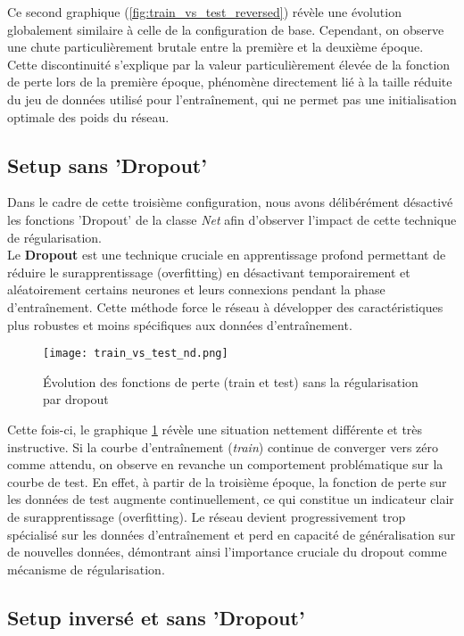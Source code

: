 Ce second graphique (\ref{fig:train_vs_test_reversed}) révèle une évolution globalement similaire à celle de la configuration de base. Cependant, on observe une chute particulièrement brutale entre la première et la deuxième époque. Cette discontinuité s'explique par la valeur particulièrement élevée de la fonction de perte lors de la première époque, phénomène directement lié à la taille réduite du jeu de données utilisé pour l'entraînement, qui ne permet pas une initialisation optimale des poids du réseau.

\newpage
\subsection{Setup sans 'Dropout'}
\label{Setup_nd}

Dans le cadre de cette troisième configuration, nous avons délibérément désactivé les fonctions 'Dropout' de la classe \textit{Net} afin d'observer l'impact de cette technique de régularisation.\\
Le \textbf{Dropout} est une technique cruciale en apprentissage profond permettant de réduire le surapprentissage (overfitting) en désactivant temporairement et aléatoirement certains neurones et leurs connexions pendant la phase d'entraînement. Cette méthode force le réseau à développer des caractéristiques plus robustes et moins spécifiques aux données d'entraînement.

\begin{figure}[H]
    \centering
    \texttt{[image: train\_vs\_test\_nd.png]}
    \caption{Évolution des fonctions de perte (train et test) sans la régularisation par dropout}
    \label{fig:train_vs_test_nd}
\end{figure}

Cette fois-ci, le graphique \ref{fig:train_vs_test_nd} révèle une situation nettement différente et très instructive. Si la courbe d'entraînement (\textit{train}) continue de converger vers zéro comme attendu, on observe en revanche un comportement problématique sur la courbe de test. En effet, à partir de la troisième époque, la fonction de perte sur les données de test augmente continuellement, ce qui constitue un indicateur clair de surapprentissage (overfitting). Le réseau devient progressivement trop spécialisé sur les données d'entraînement et perd en capacité de généralisation sur de nouvelles données, démontrant ainsi l'importance cruciale du dropout comme mécanisme de régularisation.

\newpage
\subsection{Setup inversé et sans 'Dropout'}

